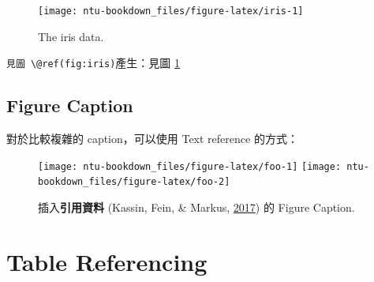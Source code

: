 \documentclass[oneside]{book}
\newenvironment{Shaded}{\begin{snugshade}}{\end{snugshade}}
\newcommand{\BaseNTok}[1]{\textcolor[rgb]{0.00,0.00,0.81}{#1}}
\newcommand{\NormalTok}[1]{#1}
\theoremstyle{definition}
\theoremstyle{definition}
\theoremstyle{definition}
\theoremstyle{remark}
\begin{document}
\begin{figure}[H]

{\centering \texttt{[image: ntu-bookdown\_files/figure-latex/iris-1]} 

}

\caption{The iris data.}\label{fig:iris}
\end{figure}

\texttt{見圖\ \textbackslash{}@ref(fig:iris)}產生：見圖 \ref{fig:iris}

\subsection{Figure Caption}\label{figure-caption}

對於比較複雜的 caption，可以使用 Text reference 的方式：

\begin{Shaded}
\end{Shaded}




\begin{figure}[H]

{\centering \texttt{[image: ntu-bookdown\_files/figure-latex/foo-1]} \texttt{[image: ntu-bookdown\_files/figure-latex/foo-2]} 

}

\caption{插入\textbf{引用資料} (Kassin, Fein, \& Markus,
\protect\hyperlink{ref-kassin2017}{2017}) 的 Figure Caption.}\label{fig:foo}
\end{figure}

\section{Table Referencing}\label{table-referencing}
\end{document}
